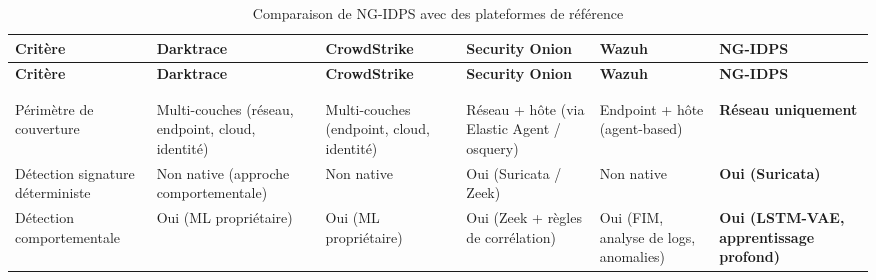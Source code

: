 \renewcommand{\arraystretch}{1.4}
\small
\begin{xltabular}{\textwidth}{|>{\raggedright\arraybackslash}X
                              |>{\raggedright\arraybackslash}X
                              |>{\raggedright\arraybackslash}X
                              |>{\raggedright\arraybackslash}X
                              |>{\raggedright\arraybackslash}X
                              |>{\raggedright\arraybackslash}X|}

\caption{Comparaison de NG-IDPS avec des plateformes de référence}
\label{tab:comparaison_solutions} \\

\hline
{}
\textbf{Critère} &
\textbf{Darktrace} &
\textbf{CrowdStrike} &
\textbf{Security Onion} &
\textbf{Wazuh} &
\textbf{NG-IDPS} \\ \hline
\endfirsthead

\hline
{}
\textbf{Critère} &
\textbf{Darktrace} &
\textbf{CrowdStrike} &
\textbf{Security Onion} &
\textbf{Wazuh} &
\textbf{NG-IDPS} \\ \hline
\endhead

\hline
{} \\
\endfoot

\hline
\endlastfoot


 \\ \hline

Périmètre de couverture &
Multi-couches (réseau, endpoint, cloud, identité) &
Multi-couches (endpoint, cloud, identité) &
Réseau + hôte (via Elastic Agent / osquery) &
Endpoint + hôte (agent-based) &
\textbf{Réseau uniquement} \\ \hline

Détection signature déterministe &
Non native (approche comportementale) &
Non native &
Oui (Suricata / Zeek) &
Non native &
\textbf{Oui (Suricata)} \\ \hline

Détection comportementale &
Oui (ML propriétaire) &
Oui (ML propriétaire) &
Oui (Zeek + règles de corrélation) &
Oui (FIM, analyse de logs, anomalies) &
\textbf{Oui (LSTM-VAE, apprentissage profond)} \\ \hline



\end{xltabular}
